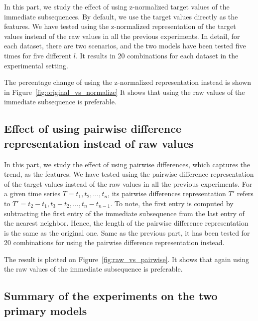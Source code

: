 In this part, we study the effect of using z-normalized target values of the immediate subsequences.
By default, we use the target values directly as the features.
We have tested using the z-normalized representation of the target values instead of the raw values in all the previous experiments.
In detail, for each dataset, there are two scenarios, and the two models have been tested five times for five different $l$. It results in 20 combinations for each dataset in the experimental setting. 

The percentage change of using the z-normalized representation instead is shown in Figure~\ref{fig:original_vs_normalize}
It shows that using the raw values of the immediate subsequence is preferable.

\subsection{Effect of using pairwise difference representation instead of raw values} %

In this part, we study the effect of using pairwise differences, which captures the trend, as the features.
We have tested using the pairwise difference representation of the target values instead of the raw values in all the previous experiments.
For a given time series $T=t_1, t_2, \dots, t_n$, its pairwise differences representation $T'$ refers to $T' = t_2-t_1, t_3-t_2, \dots, t_n-t_{n-1}$.
To note, the first entry is computed by subtracting the first entry of the immediate subsequence from the last entry of the nearest neighbor.
Hence, the length of the pairwise difference representation is the same as the original one.
Same as the previous part, it has been tested for 20 combinations for using the pairwise difference representation instead.

The result is plotted on Figure~\ref{fig:raw_vs_pairwise}.
It shows that again using the raw values of the immediate subsequence is preferable.

\subsection{Summary of the experiments on the two primary models} %


